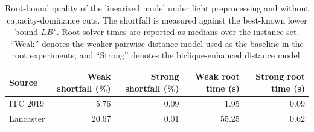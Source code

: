 \documentclass[11pt]{article}
\begin{document}
\begin{table}[t]
\centering
\scriptsize
\begin{tabular}{@{}lrrrr@{}}
\hline
Source & Weak shortfall (\%) & Strong shortfall (\%) & Weak root time (s) & Strong root time (s) \\
\hline
ITC 2019 & 5.76 & 0.09 & 1.95 & 0.09 \\
Lancaster & 20.67 & 0.01 & 55.25 & 0.62 \\
\hline
\end{tabular}
\caption{Root-bound quality of the linearized model under light preprocessing and without capacity-dominance cuts. The shortfall is measured against the best-known lower bound $LB^\star$. Root solver times are reported as medians over the instance set. ``Weak'' denotes the weaker pairwise distance model used as the baseline in the root experiments, and ``Strong'' denotes the biclique-enhanced distance model.}
\label{tab:root-gap}
\end{table}
\end{document}
